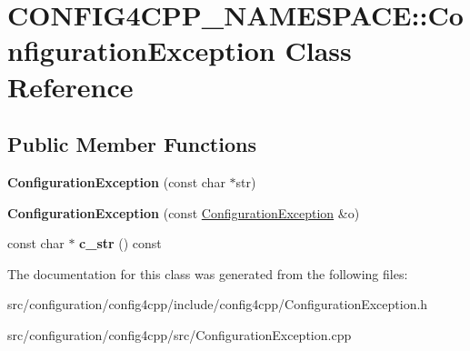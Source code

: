 \hypertarget{classCONFIG4CPP__NAMESPACE_1_1ConfigurationException}{\section{C\-O\-N\-F\-I\-G4\-C\-P\-P\-\_\-\-N\-A\-M\-E\-S\-P\-A\-C\-E\-:\-:Configuration\-Exception Class Reference}
\label{classCONFIG4CPP__NAMESPACE_1_1ConfigurationException}
}
\subsection*{Public Member Functions}
\begin{DoxyCompactItemize}
\item 
\hypertarget{classCONFIG4CPP__NAMESPACE_1_1ConfigurationException_afcf62392434113e9f5b7277916b1bdfb}{{\bfseries Configuration\-Exception} (const char $\ast$str)}\label{classCONFIG4CPP__NAMESPACE_1_1ConfigurationException_afcf62392434113e9f5b7277916b1bdfb}

\item 
\hypertarget{classCONFIG4CPP__NAMESPACE_1_1ConfigurationException_ae2dee9c0232786ca5cd15a2e3db108b0}{{\bfseries Configuration\-Exception} (const \hyperlink{classCONFIG4CPP__NAMESPACE_1_1ConfigurationException}{Configuration\-Exception} \&o)}\label{classCONFIG4CPP__NAMESPACE_1_1ConfigurationException_ae2dee9c0232786ca5cd15a2e3db108b0}

\item 
\hypertarget{classCONFIG4CPP__NAMESPACE_1_1ConfigurationException_a42c394a476808848924d096ec6fbb186}{const char $\ast$ {\bfseries c\-\_\-str} () const }\label{classCONFIG4CPP__NAMESPACE_1_1ConfigurationException_a42c394a476808848924d096ec6fbb186}

\end{DoxyCompactItemize}


The documentation for this class was generated from the following files\-:\begin{DoxyCompactItemize}
\item 
src/configuration/config4cpp/include/config4cpp/Configuration\-Exception.\-h\item 
src/configuration/config4cpp/src/Configuration\-Exception.\-cpp\end{DoxyCompactItemize}

